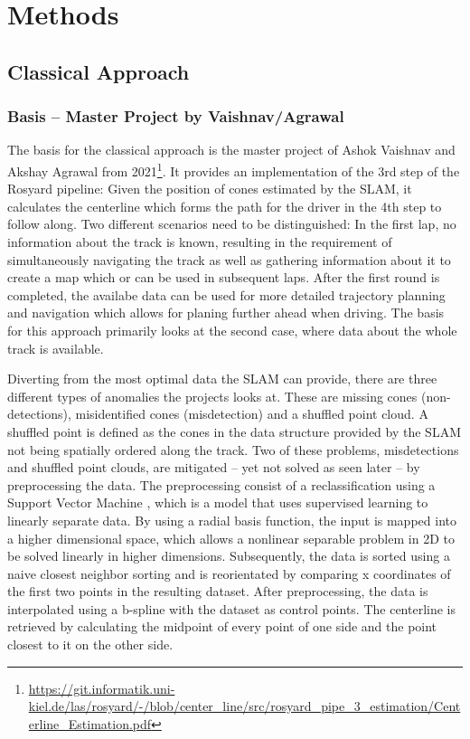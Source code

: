 \graphicspath{{Chapter/Figs/methods/}}
\chapter{Methods}


\section{Classical Approach}

\subsection{Basis – Master Project by Vaishnav/Agrawal}
The basis for the classical approach is the master project of Ashok Vaishnav and Akshay Agrawal from 2021\footnote{\url{https://git.informatik.uni-kiel.de/las/rosyard/-/blob/center_line/src/rosyard_pipe_3_estimation/Centerline_Estimation.pdf}}.
It provides an implementation of the 3rd step of the Rosyard pipeline: Given the position of cones estimated by the SLAM, it calculates the centerline which forms the path for the driver in the 4th step to follow along.
Two different scenarios need to be distinguished: In the first lap, no information about the track is known, resulting in the requirement of simultaneously navigating the track as well as gathering information about it to create a map which or can be used in subsequent laps. After the first round is completed, the availabe data can be used for more detailed trajectory planning and navigation which allows for planing further ahead when driving. The basis for this approach primarily looks at the second case, where data about the whole track is available.

Diverting from the most optimal data the SLAM can provide, there are three different types of anomalies the projects looks at. These are missing cones (non-detections), misidentified cones (misdetection) and a shuffled point cloud. A shuffled point is defined as the cones in the data structure provided by the SLAM not being spatially ordered along the track. Two of these problems, misdetections and shuffled point clouds, are mitigated – yet not solved as seen later – by preprocessing the data. The preprocessing consist of a reclassification using a Support Vector Machine \cite{cortes1995}, which is a model that uses supervised learning to linearly separate data. By using a radial basis function, the input is mapped into a higher dimensional space, which allows a nonlinear separable problem in 2D to be solved linearly in higher dimensions. Subsequently, the data is sorted using a naive closest neighbor sorting and is reorientated by comparing x coordinates of the first two points in the resulting dataset. After preprocessing, the data is interpolated using a b-spline with the dataset as control points. The centerline is retrieved by calculating the midpoint of every point of one side and the point closest to it on the other side.

